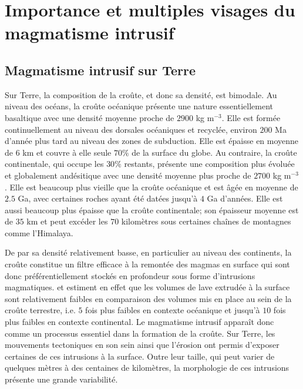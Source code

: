 \section{Importance et multiples visages du magmatisme intrusif}
\label{C1-sec:zool-des-intr}

\subsection{Magmatisme intrusif sur Terre}
\label{C1-sec:definition}

Sur  Terre, la  composition  de la  croûte, et  donc  sa densité,  est
bimodale.   Au niveau  des océans,  la croûte  océanique présente  une
nature essentiellement  basaltique avec une densité  moyenne proche de
$2900$ kg  m$^{-3}$.  Elle  est formée  continuellement au  niveau des
dorsales océaniques et recyclée, environ $200$ Ma d'année plus tard au
niveau des zones de subduction. Elle  est épaisse en moyenne de $6$ km
et couvre à elle seule $70\%$ de la surface du globe. Au contraire, la
croûte  continentale, qui  occupe  les $30\%$  restants, présente  une
composition plus  évoluée et globalement andésitique  avec une densité
moyenne plus  proche de  $2700$ kg m$^{-3}$.   Elle est  beaucoup plus
vieille que  la croûte océanique et  est âgée en moyenne  de $2.5$ Ga,
avec certaines roches ayant été  datées jusqu'à $4$ Ga d'années.  Elle
est  aussi  beaucoup plus  épaisse  que  la croûte  continentale;  son
épaisseur moyenne est  de $35$ km et peut excéder  les $70$ kilomètres
sous certaines chaînes de montagnes comme l'Himalaya.

De par  sa densité  relativement basse, en  particulier au  niveau des
continents, la croûte  constitue un filtre efficace à  la remontée des
magmas  en  surface  qui   sont  donc  préférentiellement  stockés  en
profondeur sous forme  d'intrusions magmatiques.  \citet{Crisp:1984dm}
et  \citet{White:2006gr} estiment  en effet  que les  volumes de  lave
extrudée à  la surface  sont relativement  faibles en  comparaison des
volumes mis  en place au sein  de la croûte terrestre,  i.e.  $5$ fois
plus faibles en  contexte océanique et jusqu'à $10$  fois plus faibles
en contexte  continental.  Le magmatisme intrusif  apparaît donc comme
un processus essentiel dans la formation de la croûte.  Sur Terre, les
mouvements  tectoniques en  son sein  ainsi que  l'érosion ont  permis
d'exposer  certaines  de ces  intrusions  à  la surface.   Outre  leur
taille,  qui  peut  varier  de  quelques mètres  à  des  centaines  de
kilomètres,  la  morphologie de  ces  intrusions  présente une  grande
variabilité.

